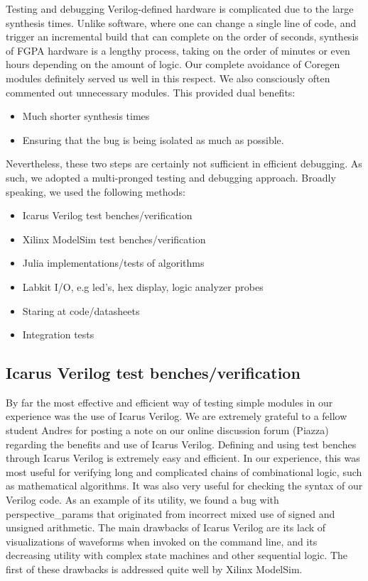 \documentclass{article}
\begin{document}
Testing and debugging Verilog-defined hardware is complicated due to the large synthesis times.
Unlike software, where one can change a single line of code,
and trigger an incremental build that can complete on the order of seconds,
synthesis of FGPA hardware is a lengthy process,
taking on the order of minutes or even hours depending on the amount of logic.
Our complete avoidance of Coregen modules definitely served us well in this respect.
We also consciously often commented out unnecessary modules.
This provided dual benefits:
\begin{itemize}
\item Much shorter synthesis times
\item Ensuring that the bug is being isolated as much as possible.
\end{itemize}
Nevertheless, these two steps are certainly not sufficient in efficient debugging.
As such, we adopted a multi-pronged testing and debugging approach.
Broadly speaking, we used the following methods:
\begin{itemize}
\item Icarus Verilog test benches/verification
\item Xilinx ModelSim test benches/verification
\item Julia implementations/tests of algorithms
\item Labkit I/O, e.g led's, hex display, logic analyzer probes
\item Staring at code/datasheets
\item Integration tests
\end{itemize}

\subsection{Icarus Verilog test benches/verification}
By far the most effective and efficient way of testing simple modules in our experience was the use of Icarus Verilog.
We are extremely grateful to a fellow student Andres for posting a note on our online discussion forum (Piazza) regarding the benefits and use of Icarus Verilog.
Defining and using test benches through Icarus Verilog is extremely easy and efficient.
In our experience, this was most useful for verifying long and complicated chains of combinational logic, such as mathematical algorithms.
It was also very useful for checking the syntax of our Verilog code.
As an example of its utility, we found a bug with perspective\_params that originated from incorrect mixed use of signed and unsigned arithmetic.
The main drawbacks of Icarus Verilog are its lack of visualizations of waveforms when invoked on the command line,
and its decreasing utility with complex state machines and other sequential logic.
The first of these drawbacks is addressed quite well by Xilinx ModelSim.
\end{document}
